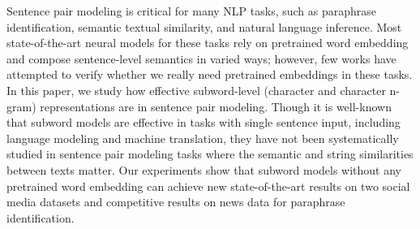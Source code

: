 Sentence pair modeling is critical for many NLP tasks, such as paraphrase identification, semantic textual similarity, and natural language inference. Most state-of-the-art neural models for these tasks rely on pretrained word embedding and compose sentence-level semantics in varied ways; however, few works have attempted to verify whether we really need pretrained embeddings in these tasks. In this paper, we study how effective subword-level (character and character n-gram) representations are in sentence pair modeling. Though it is well-known that subword models are effective in tasks with single sentence input, including language modeling and machine translation, they have not been systematically studied in sentence pair modeling tasks where the semantic and string similarities between texts matter. Our experiments show that subword models without any pretrained word embedding can achieve new state-of-the-art results on two social media datasets and competitive results on news data for paraphrase identification.
